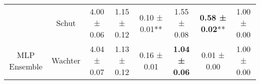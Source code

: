 \begin{table}
{\begin{tabular}[t]{cccccccc}
 & Schut & 4.00 ± 0.06\hphantom{*}\hphantom{*} & 1.15 ± 0.12\hphantom{*}\hphantom{*} & 0.10 ± 0.01** & 1.55 ± 0.08\hphantom{*}\hphantom{*} & \textbf{0.58 ± 0.02}** & 1.00 ± 0.00\hphantom{*}\hphantom{*}\\

\multirow[t]{-7}{*}{\centering\arraybackslash MLP Ensemble} & Wachter & 4.04 ± 0.07\hphantom{*}\hphantom{*} & 1.13 ± 0.12\hphantom{*}\hphantom{*} & 0.16 ± 0.01\hphantom{*}\hphantom{*} & \textbf{1.04 ± 0.06}\hphantom{*}\hphantom{*} & 0.01 ± 0.00\hphantom{*}\hphantom{*} & 1.00 ± 0.00\hphantom{*}\hphantom{*}\\
\bottomrule
\end{tabular}}
\end{table}
